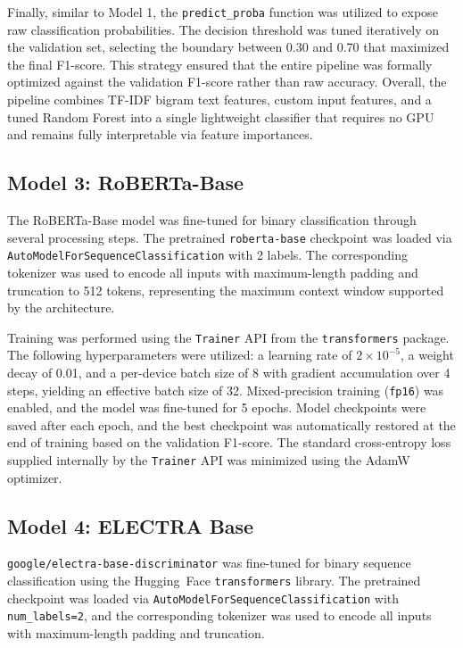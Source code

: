 \documentclass[11pt]{article}
\begin{document}
Finally, similar to Model 1, the \texttt{predict\_proba} function was utilized to expose raw classification probabilities. The decision threshold was tuned iteratively on the validation set, selecting the boundary between 0.30 and 0.70 that maximized the final F1-score. This strategy ensured that the entire pipeline was formally optimized against the validation F1-score rather than raw accuracy. Overall, the pipeline combines TF-IDF bigram text features, custom input features, and a tuned Random Forest into a single lightweight classifier that requires no GPU and remains fully interpretable via feature importances.

\subsection{Model 3: RoBERTa-Base}
The RoBERTa-Base model was fine-tuned for binary classification through several processing steps. The pretrained \texttt{roberta-base} checkpoint was loaded via \texttt{AutoModelForSequenceClassification} with 2 labels. The corresponding tokenizer was used to encode all inputs with maximum-length padding and truncation to 512 tokens, representing the maximum context window supported by the architecture.

Training was performed using the \texttt{Trainer} API from the \texttt{transformers} package. The following hyperparameters were utilized: a learning rate of $2 \times 10^{-5}$, a weight decay of 0.01, and a per-device batch size of 8 with gradient accumulation over 4 steps, yielding an effective batch size of 32. Mixed-precision training (\texttt{fp16}) was enabled, and the model was fine-tuned for 5 epochs. Model checkpoints were saved after each epoch, and the best checkpoint was automatically restored at the end of training based on the validation F1-score. The standard cross-entropy loss supplied internally by the \texttt{Trainer} API was minimized using the AdamW optimizer.

\subsection{Model 4: ELECTRA Base}
\texttt{google/electra-base-discriminator} was fine-tuned for binary sequence classification using the Hugging~Face \texttt{transformers} library. The pretrained checkpoint was loaded via \texttt{AutoModelForSequenceClassification} with \texttt{num\_labels=2}, and the corresponding tokenizer was used to encode all inputs with maximum-length padding and truncation.
\end{document}
